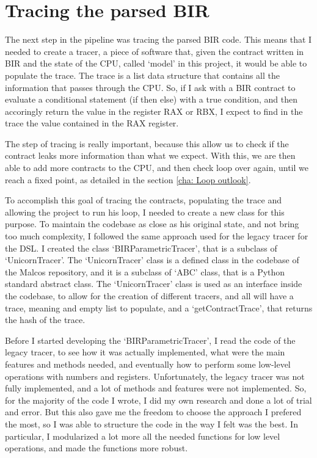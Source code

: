 \section{Tracing the parsed BIR}
\label{cha:Tracing the parsed BIR} The next step in the pipeline was tracing the
parsed BIR code. This means that I needed to create a tracer, a piece of software
that, given the contract written in BIR and the state of the CPU, called `model'
in this project, it would be able to populate the trace. The trace is a list data
structure that contains all the information that passes through the CPU. So, if I
ask with a BIR contract to evaluate a conditional statement (if then else) with a
true condition, and then accoringly return the value in the register RAX or RBX,
I expect to find in the trace the value contained in the RAX register.

The step of tracing is really important, because this allow us to check if the
contract leaks more information than what we expect. With this, we are then able
to add more contracts to the CPU, and then check loop over again, until we reach
a fixed point, as detailed in the section \ref{cha: Loop outlook}.

To accomplish this goal of tracing the contracts, populating the trace and
allowing the project to run his loop, I needed to create a new class for this purpose.
To maintain the codebase as close as his original state, and not bring too much complexity,
I followed the same approach used for the legacy tracer for the DSL. I created the
class `BIRParametricTracer', that is a subclass of `UnicornTracer'. The `UnicornTracer'
class is a defined class in the codebase of the Malcos repository, and it is a
subclass of `ABC' class, that is a Python standard abstract class. The `UnicornTracer'
class is used as an interface inside the codebase, to allow for the creation of different
tracers, and all will have a trace, meaning and empty list to populate, and a `getContractTrace',
that returns the hash of the trace.

Before I started developing the `BIRParametricTracer', I read the code of the
legacy tracer, to see how it was actually implemented, what were the main
features and methods needed, and eventually how to perform some low-level operations
with numbers and registers. Unfortunately, the legacy tracer was not fully implemented,
and a lot of methods and features were not implemented. So, for the majority of
the code I wrote, I did my own research and done a lot of trial and error. But
this also gave me the freedom to choose the approach I prefered the most, so I was
able to structure the code in the way I felt was the best. In particular, I modularized
a lot more all the needed functions for low level operations, and made the
functions more robust.

